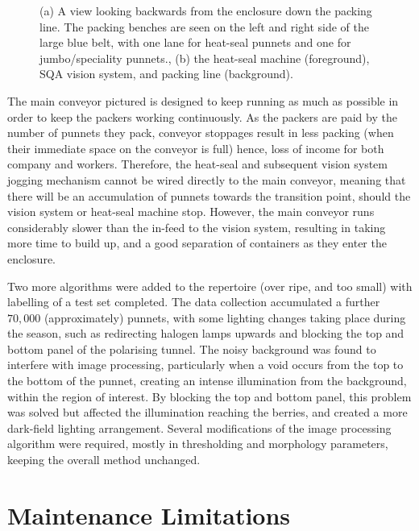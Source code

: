 \documentclass[fleqn,twoside,12pt]{report}
\begin{document}
\begin{figure}[ht]
\begin{subfigure}{.35\textwidth}
		\caption{}
		\label{fig:myponga_system_line}
	\end{subfigure}%
	
	\caption{(a) A view looking backwards from the enclosure down the packing line. The packing benches are seen on the left and right side of the large blue belt, with one lane for heat-seal punnets and one for jumbo/speciality punnets., (b) the heat-seal machine (foreground), SQA vision system, and packing line (background).}
	\label{}
\end{figure}

The main conveyor pictured is designed to keep running as much as possible in order to keep the packers working continuously. As the packers are paid by the number of punnets they pack, conveyor stoppages result in less packing (when their immediate space on the conveyor is full) hence, loss of income for both company and workers. Therefore, the heat-seal and subsequent vision system jogging mechanism cannot be wired directly to the main conveyor, meaning that there will be an accumulation of punnets towards the transition point, should the vision system or heat-seal machine stop. However, the main conveyor runs considerably slower than the in-feed to the vision system, resulting in taking more time to build up, and a good separation of containers as they enter the enclosure.

Two more algorithms were added to the repertoire (over ripe, and too small) with labelling of a test set completed. The data collection accumulated a further $70,000$ (approximately) punnets, with some lighting changes taking place during the season, such as redirecting halogen lamps upwards and blocking the top and bottom panel of the polarising tunnel. The noisy background was found to interfere with image processing, particularly when a void occurs from the top to the bottom of the punnet, creating an intense illumination from the background, within the region of interest. By blocking the top and bottom panel, this problem was solved but affected the illumination reaching the berries, and created a more dark-field lighting arrangement. Several modifications of the image processing algorithm were required, mostly in thresholding and morphology parameters, keeping the overall method unchanged. 



\section{Maintenance Limitations}
\label{sec:maintenance}
\end{document}

